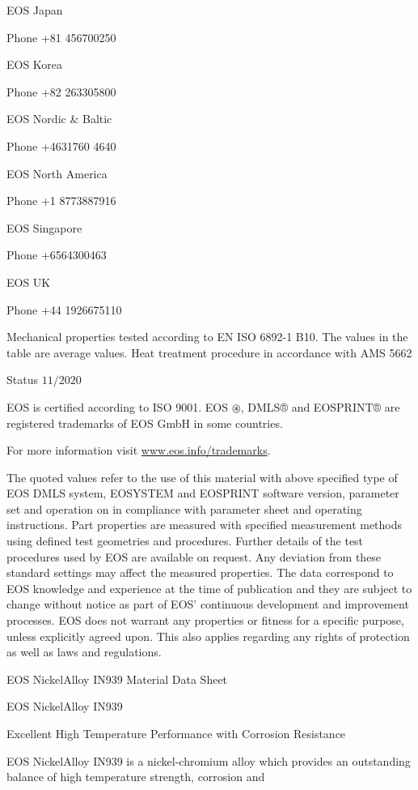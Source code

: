 \documentclass[10pt]{article}
\begin{document}
EOS Japan

Phone +81 456700250

EOS Korea

Phone +82 263305800

EOS Nordic \& Baltic

Phone +4631760 4640

EOS North America

Phone +1 8773887916

EOS Singapore

Phone +6564300463

EOS UK

Phone +44 1926675110

Mechanical properties tested according to EN ISO 6892-1 B10. The values in the table are average values. Heat treatment procedure in accordance with AMS 5662

Status $11 / 2020$

EOS is certified according to ISO 9001. EOS $\circledast$, DMLS® and EOSPRINT® are registered trademarks of EOS GmbH in some countries.

For more information visit \href{http://www.eos.info/trademarks}{www.eos.info/trademarks}.

The quoted values refer to the use of this material with above specified type of EOS DMLS system, EOSYSTEM and EOSPRINT software version, parameter set and operation on in compliance with parameter sheet and operating instructions. Part properties are measured with specified measurement methods using defined test geometries and procedures. Further details of the test procedures used by EOS are available on request. Any deviation from these standard settings may affect the measured properties. The data correspond to EOS knowledge and experience at the time of publication and they are subject to change without notice as part of EOS' continuous development and improvement processes. EOS does not warrant any properties or fitness for a specific purpose, unless explicitly agreed upon. This also applies regarding any rights of protection as well as laws and regulations.

EOS NickelAlloy IN939 Material Data Sheet

EOS NickelAlloy IN939

Excellent High Temperature Performance with Corrosion Resistance

EOS NickelAlloy IN939 is a nickel-chromium alloy which provides an outstanding balance of high temperature strength, corrosion and
\end{document}
